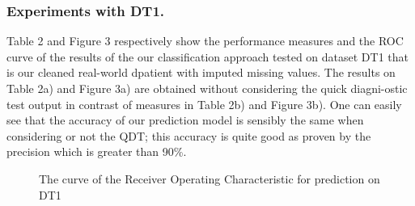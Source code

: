 \subsubsection{Experiments with DT1.}
Table 2 and Figure 3 respectively show the performance measures and the ROC curve of the results of the our classification approach tested on dataset 
DT1 that is our cleaned real-world dpatient with imputed missing values. The results on Table 2a) and Figure 3a) are obtained without considering the 
quick diagni-ostic test output in contrast of measures in Table 2b) and Figure 3b). One can easily see that the accuracy of our prediction model is 
sensibly the same when considering or not the QDT; this accuracy is quite good as proven by the precision which is greater than 90\%.  

\begin{table}[!h]
\centering
{}%
\hspace*{0.5cm}
%
\label{perf-measure-dt1}\caption{Performance measures of the prediction on DT1}
\end{table}

\begin{figure}[!h]
\centering
{}%
\caption{The curve of the Receiver Operating Characteristic for prediction on DT1}\label{curve_roc_dt1}
\end{figure}



